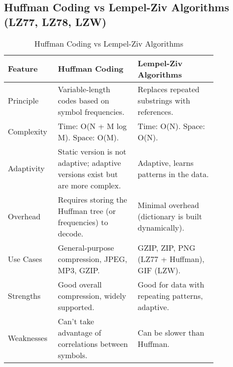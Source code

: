 \subsection{Huffman Coding vs Lempel-Ziv Algorithms (LZ77, LZ78, LZW)}  
\begin{table}[H]  
    \centering   
    \renewcommand{\arraystretch}{1.5} %
    \setlength{\tabcolsep}{8pt} %
    \begin{tabular}{|p{0.15\linewidth}|p{0.35\linewidth}|p{0.35\linewidth}|}  
    \hline  
    \rowcolor{gray!30}  
        \textbf{Feature} & \textbf{Huffman Coding} & \textbf{Lempel-Ziv Algorithms}\\\hline  
        Principle & Variable-length codes based on symbol frequencies. & Replaces repeated substrings with references. \\\hline  
        Complexity & Time:   O(N + M log M). \newline Space: O(M). & Time: O(N). \newline Space: O(N).\\\hline  
        Adaptivity & Static version is not adaptive; adaptive versions exist but are more complex. & Adaptive, learns patterns in the data. \\\hline  
        Overhead & Requires storing the Huffman tree (or frequencies) to decode. & Minimal overhead (dictionary is built dynamically).\\\hline  
        Use Cases & General-purpose compression, JPEG, MP3, GZIP. & GZIP, ZIP, PNG (LZ77 + Huffman), GIF (LZW).\\\hline  
        Strengths & Good overall compression, widely supported. & Good for data with repeating patterns, adaptive.\\\hline  
        Weaknesses & Can’t take advantage of correlations between symbols. & Can be slower than Huffman.\\\hline  
    \end{tabular}  
    \caption{Huffman Coding vs Lempel-Ziv Algorithms}  
    \label{tab:Huffman_vs_Lempel-Ziv}  
\end{table}  
